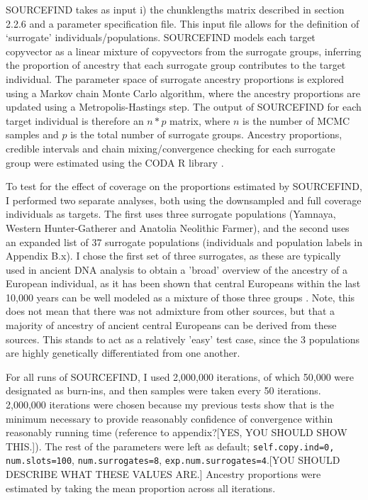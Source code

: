 SOURCEFIND takes as input i) the chunklengths matrix described in section 2.2.6 and a parameter specification file. This input file allows for the definition of `surrogate' individuals/populations. SOURCEFIND models each target copyvector as a linear mixture of copyvectors from the surrogate groups, inferring the proportion of ancestry that each surrogate group contributes to the target individual. The parameter space of surrogate ancestry proportions is explored using a Markov chain Monte Carlo algorithm, where the ancestry proportions are updated using a Metropolis-Hastings step. The output of SOURCEFIND for each target individual is therefore an $n*p$ matrix, where $n$ is the number of MCMC samples and $p$ is the total number of surrogate groups. Ancestry proportions, credible intervals and chain mixing/convergence checking for each surrogate group were estimated using the CODA R library \cite{oro22547}.

To test for the effect of coverage on the proportions estimated by SOURCEFIND, I performed two separate analyses, both using the downsampled and full coverage individuals as targets. The first uses three surrogate populations (Yamnaya, Western Hunter-Gatherer and Anatolia Neolithic Farmer), and the second uses an expanded list of 37 surrogate populations (individuals and population labels in Appendix B.x). I chose the first set of three surrogates, as these are typically used in ancient DNA analysis to obtain a 'broad' overview of the ancestry of a European individual, as it has been shown that central Europeans within the last 10,000 years can be well modeled as a mixture of those three groups \cite{Lazaridis2014, Haak2015}. Note, this does not mean that there was not admixture from other sources, but that a majority of ancestry of ancient central Europeans can be derived from these sources. This stands to act as a relatively 'easy' test case, since the 3 populations are highly genetically differentiated from one another.

For all runs of SOURCEFIND, I used 2,000,000 iterations, of which 50,000 were designated as burn-ins, and then samples were taken every 50 iterations. 2,000,000 iterations were chosen because my previous tests show that is the minimum necessary to provide reasonably confidence of convergence within reasonably running time (reference to appendix?{\color{red}[YES, YOU SHOULD SHOW THIS.]}). The rest of the parameters were left as default; \texttt{self.copy.ind=0,} \texttt{num.slots=100}, \texttt{num.surrogates=8}, \texttt{exp.num.surrogates=4}.{\color{red}[YOU SHOULD DESCRIBE WHAT THESE VALUES ARE.]} Ancestry proportions were estimated by taking the mean proportion across all iterations. 

